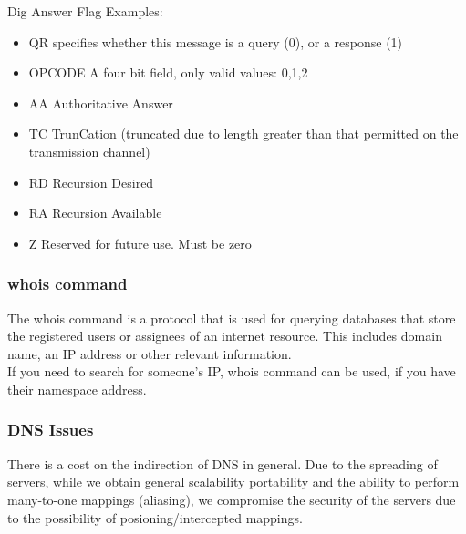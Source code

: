 \documentclass{article}
\begin{document}
\noindent{}
Dig Answer Flag Examples:
\begin{itemize}
    \item QR specifies whether this message is a query (0), or a response (1)
    \item OPCODE A four bit field, only valid values: 0,1,2
    \item AA Authoritative Answer
    \item TC TrunCation (truncated due to length greater than that permitted on the transmission channel)
    \item RD Recursion Desired
    \item RA Recursion Available
    \item Z Reserved for future use. Must be zero
\end{itemize}

\pagebreak
\subsubsection{whois command}
The whois command is a protocol that is used for querying databases that store the registered users or assignees of an internet resource. This includes domain name, an IP address or other relevant information.\\
If you need to search for someone's IP, whois command can be used, if you have their namespace address.\\
\subsubsection{DNS Issues}
There is a cost on the indirection of DNS in general. Due to the spreading of servers, while we obtain general scalability portability and the ability to perform many-to-one mappings (aliasing), we compromise the security of the servers due to the possibility of posioning/intercepted mappings.\\
\end{document}
